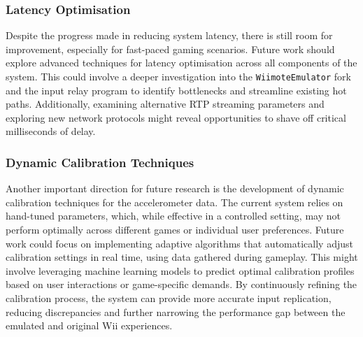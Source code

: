 \subsubsection{Latency Optimisation}
Despite the progress made in reducing system latency, there is still room for
improvement, especially for fast-paced gaming scenarios. Future work should
explore advanced techniques for latency optimisation across all components of
the system. This could involve a deeper investigation into the
\texttt{WiimoteEmulator} fork and the input relay program to identify
bottlenecks and streamline existing hot paths. Additionally, examining
alternative RTP streaming parameters and exploring new network protocols might
reveal opportunities to shave off critical milliseconds of delay.

\subsubsection{Dynamic Calibration Techniques}
Another important direction for future research is the development of dynamic
calibration techniques for the accelerometer data. The current system relies on
hand-tuned parameters, which, while effective in a controlled setting, may not
perform optimally across different games or individual user preferences. Future
work could focus on implementing adaptive algorithms that automatically adjust
calibration settings in real time, using data gathered during gameplay. This
might involve leveraging machine learning models to predict optimal calibration
profiles based on user interactions or game-specific demands. By continuously
refining the calibration process, the system can provide more accurate input
replication, reducing discrepancies and further narrowing the performance gap
between the emulated and original Wii experiences.
